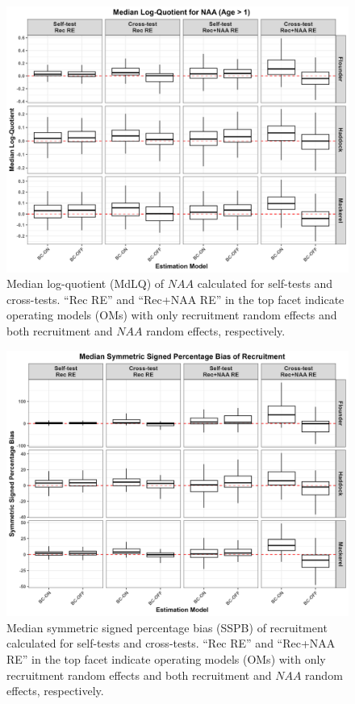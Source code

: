\documentclass[
  12pt,
]{article}
\begin{document}
\begin{figure}[H]
    \centering
    \includegraphics[width=\textwidth]{Revised_Figures&Tables/MdLQ_NAA.PNG}
    \caption{Median log-quotient (MdLQ) of $NAA$ calculated for self-tests and cross-tests. ``Rec RE'' and ``Rec+NAA RE'' in the top facet indicate operating models (OMs) with only recruitment random effects and both recruitment and $NAA$ random effects, respectively.}
    \label{fig:supp_NAA_MdLQ}
\end{figure}

\begin{figure}[H]
    \centering
    \includegraphics[width=\textwidth]{Revised_Figures&Tables/Median_Rec_SSPB.PNG}
    \caption{Median symmetric signed percentage bias (SSPB) of recruitment calculated for self-tests and cross-tests. ``Rec RE'' and ``Rec+NAA RE'' in the top facet indicate operating models (OMs) with only recruitment random effects and both recruitment and $NAA$ random effects, respectively.}
    \label{fig:supp_Rec_SSPB}
\end{figure}
\end{document}
